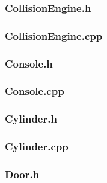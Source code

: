 \documentclass{article}
\begin{document}
\subsubsection{CollisionEngine.h}
	
					
\subsubsection{CollisionEngine.cpp}
	
					
\subsubsection{Console.h}
	
					
\subsubsection{Console.cpp}
	
					
\subsubsection{Cylinder.h}
	
					
\subsubsection{Cylinder.cpp}
	
					
\subsubsection{Door.h}
	
\end{document}
